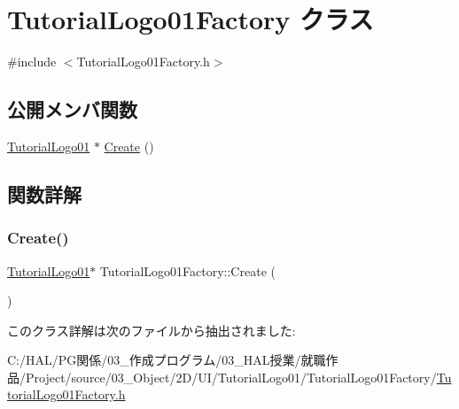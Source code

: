 \hypertarget{class_tutorial_logo01_factory}{}\section{Tutorial\+Logo01\+Factory クラス}
\label{class_tutorial_logo01_factory}


{\ttfamily \#include $<$Tutorial\+Logo01\+Factory.\+h$>$}

\subsection*{公開メンバ関数}
\begin{DoxyCompactItemize}
\item 
\mbox{\hyperlink{class_tutorial_logo01}{Tutorial\+Logo01}} $\ast$ \mbox{\hyperlink{class_tutorial_logo01_factory_af38857ea9d9f5c98faeba64291e02f89}{Create}} ()
\end{DoxyCompactItemize}


\subsection{関数詳解}
\mbox{\label{class_tutorial_logo01_factory_af38857ea9d9f5c98faeba64291e02f89}} 
\subsubsection{\texorpdfstring{Create()}{Create()}}
{\footnotesize\ttfamily \mbox{\hyperlink{class_tutorial_logo01}{Tutorial\+Logo01}}$\ast$ Tutorial\+Logo01\+Factory\+::\+Create (\begin{DoxyParamCaption}{ }\end{DoxyParamCaption})\hspace{0.3cm}{\ttfamily [inline]}}



このクラス詳解は次のファイルから抽出されました\+:\begin{DoxyCompactItemize}
\item 
C\+:/\+H\+A\+L/\+P\+G関係/03\+\_\+作成プログラム/03\+\_\+\+H\+A\+L授業/就職作品/\+Project/source/03\+\_\+\+Object/2\+D/\+U\+I/\+Tutorial\+Logo01/\+Tutorial\+Logo01\+Factory/\mbox{\hyperlink{_tutorial_logo01_factory_8h}{Tutorial\+Logo01\+Factory.\+h}}\end{DoxyCompactItemize}
